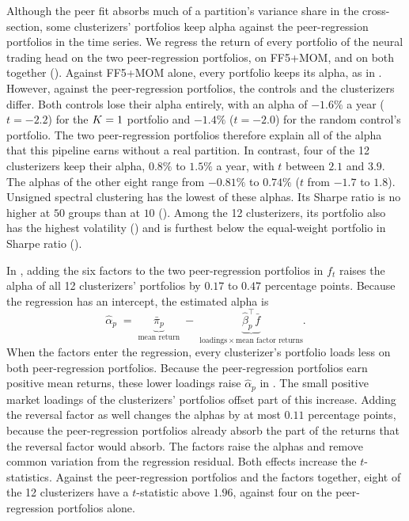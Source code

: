 Although the peer fit absorbs much of a partition's variance share in the cross-section, some clusterizers' portfolios keep alpha against the peer-regression portfolios in the time series. We regress the return of every portfolio of the neural trading head on the two peer-regression portfolios,
on FF5+MOM, and on both together (). Against FF5+MOM alone, every portfolio keeps its alpha, as in . However, against the peer-regression portfolios, the controls and the clusterizers differ. Both controls lose their alpha entirely, with an alpha of $-1.6\%$ a year ($t=-2.2$) for the $K=1$ portfolio and $-1.4\%$ ($t=-2.0$) for the random control's portfolio. The two peer-regression portfolios therefore explain all of the alpha that this pipeline
earns without a real partition. In contrast, four of the 12 clusterizers keep their alpha, $0.8\%$ to $1.5\%$ a year, with $t$ between $2.1$ and $3.9$. The alphas of the other eight range from $-0.81\%$ to $0.74\%$ ($t$ from $-1.7$ to $1.8$). Unsigned spectral clustering has the lowest of these alphas. Its Sharpe ratio is no higher at $50$ groups than at $10$ (). Among the 12 clusterizers, its portfolio also has the highest volatility () and is furthest below the equal-weight portfolio in Sharpe ratio ().

In , adding the six factors to the two peer-regression portfolios in $f_t$ raises the alpha of all 12 clusterizers' portfolios by $0.17$ to $0.47$ percentage points. Because the regression has an intercept, the estimated alpha is
%
\begin{equation}\label{eq:alphaid}
  \hat\alpha_p \;=\; \underbrace{\bar\pi_p}_{\text{mean return}} \;-\; \underbrace{\hat\beta_p^{\top} \bar f}_{\text{loadings} \,\times\, \text{mean factor returns}} .
\end{equation}
%
When the factors enter the regression, every clusterizer's portfolio loads less on both peer-regression portfolios. Because the peer-regression portfolios earn positive mean returns, these lower loadings raise $\hat\alpha_p$ in . The small positive market loadings of the clusterizers' portfolios offset part of this increase. Adding the reversal factor as well changes the alphas by at most $0.11$ percentage points, because the peer-regression portfolios already absorb the part of the returns that the reversal factor would absorb. The factors raise the alphas and remove common variation from the regression residual. Both effects increase the $t$-statistics. Against the peer-regression portfolios and the factors together, eight of the 12 clusterizers have a $t$-statistic above $1.96$, against four on the peer-regression portfolios alone.

